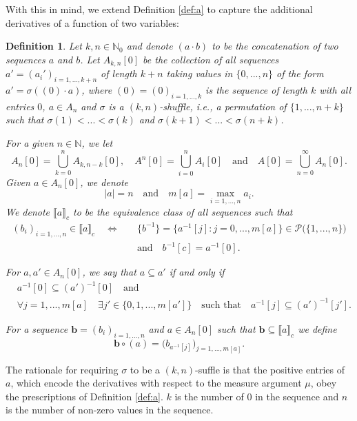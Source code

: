 \documentclass[a4paper,11pt,twoside]{article}
\numberwithin{equation}{section}
\theoremstyle{plain}
\newtheorem{definition}[theorem]{Definition}
\newcommand{\bN}{\mathbb{N}}
\newcommand{\scP}{\mathscr{P}}
\newcommand{\A}[1]{A_{#1}[0]}
\newcommand{\1}{\mathbbm{1}}
\begin{document}
	With this in mind, we extend Definition \ref{def:a} to capture the additional derivatives of a function of two variables:
	\begin{definition}
		\label{definition:A_0^n}
		Let $k, n\in \bN_0$ and denote $(a\cdot b)$ to be the concatenation of two sequences $a$ and $b$. Let $A_{k,n}[0]$ be the collection of all sequences 
		$a' = (a_i')_{i=1, ..., k+n}$ of length $k+n$ taking values in $\{0, ..., n\}$ of the form $a' = \sigma( (0) \cdot a)$, where $(0) = (0)_{i=1, ..., k}$ is the sequence of length $k$ with all entries $0$, $a\in A_n$ and $\sigma$ is a $(k,n)$-shuffle, i.e., a permutation of $\{1, ..., n+k\}$ such that $\sigma(1) < ... < \sigma(k)$ and $\sigma(k+1)<... < \sigma(n+k)$. 
		
		For a given $n \in \bN$, we let 
		$$
		\A{n}= \bigcup_{k=0}^n A_{k,n-k}[0], 
		\quad
		A^n[0] = \bigcup_{i=0}^n \A{i} \quad \mbox{and} 
		\quad
		A[0] = \bigcup_{n=0}^{\infty} \A{n}. 
		$$
		Given $a\in A_n[0]$, we denote 
		$$
		|a| = n \quad \mbox{and}\quad m[a] = \max_{i=1, ..., n} a_i.
		$$ 
		We denote $\llbracket a\rrbracket_c$ to be the equivalence class of all sequences such that
		\begin{align*}
			(b_i)_{i=1, ..., n} \in \llbracket a\rrbracket_c \quad \iff \quad &\Big\{ b^{-1} \Big\} = \Big\{ a^{-1}[j]: j=0, ..., m[a] \Big\} \in \scP\big( \{1, ..., n\} \big)
			\\ 
			& \mbox{and}\quad b^{-1}[c] = a^{-1}[0]. 
		\end{align*}
		
		For $a, a'\in A_n[0]$, we say that $a \subseteq a'$ if and only if
		\begin{align*}
			&a^{-1}[0] \subseteq (a')^{-1}[0] \quad \mbox{and}
			\\
			&\forall j=1, ..., m[a]\quad \exists j' \in \{0, 1, ..., m[a']\} \quad \mbox{such that} \quad a^{-1}[j] \subseteq (a')^{-1}[j']. 
		\end{align*}
		
		For a sequence $\boldsymbol{b} = (b_i)_{i=1, ..., n}$ and $a\in A_n[0]$ such that $\boldsymbol{b} \subseteq \llbracket a \rrbracket_c$ we define
		\begin{equation}
			\label{eq:K-sequence2}
			\boldsymbol{b}\circ(a) = \Big( b_{a^{-1}[j]} \Big)_{j=1, ..., m[a]}. 
		\end{equation}	
	\end{definition}
	
	The rationale for requiring $\sigma$ to be a $(k,n)$-suffle is that the positive entries of $a$, which encode the derivatives with respect to the measure argument $\mu$, obey the prescriptions of Definition  \ref{def:a}. $k$ is the number of $0$ in the sequence and $n$ is the number of non-zero values in the sequence. 
	
\end{document}
